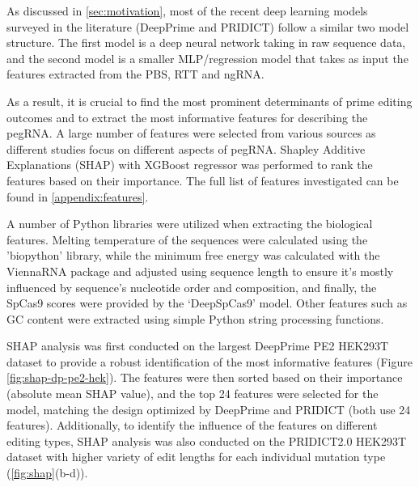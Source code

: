 As discussed in \autoref{sec:motivation}, most of the recent deep learning models surveyed in the literature (DeepPrime\cite{yuPredictionEfficienciesDiverse2023} and PRIDICT\cite{mathisPredictingPrimeEditing2023,mathisMachineLearningPrediction2024}) follow a similar two model structure. The first model is a deep neural network taking in raw sequence data, and the second model is a smaller MLP/regression model that takes as input the features extracted from the PBS, RTT and ngRNA. 

As a result, it is crucial to find the most prominent determinants of prime editing outcomes and to extract the most informative features for describing the pegRNA. A large number of features were selected from various sources as different studies focus on different aspects of pegRNA. Shapley Additive Explanations (SHAP) with XGBoost regressor was performed to rank the features based on their importance. The full list of features investigated can be found in \autoref{appendix:features}. 

A number of Python libraries were utilized when extracting the biological features. Melting temperature of the sequences were calculated using the 'biopython' library\cite{cockBiopythonFreelyAvailable2009}, while the minimum free energy was calculated with the ViennaRNA package and adjusted using sequence length to ensure it's mostly influenced by sequence's nucleotide order and composition\cite{lorenzViennaRNAPackage2011,trottaNormalizationMinimumFree2014}, and finally, the SpCas9 scores were provided by the `DeepSpCas9' model\cite{kimSpCas9ActivityPrediction2019}. Other features such as GC content were extracted using simple Python string processing functions.

SHAP analysis was first conducted on the largest DeepPrime PE2 HEK293T dataset to provide a robust identification of the most informative features (Figure \ref{fig:shap-dp-pe2-hek}). The features were then sorted based on their importance (absolute mean SHAP value), and the top 24 features were selected for the model, matching the design optimized by DeepPrime and PRIDICT (both use 24 features)\cite{yuPredictionEfficienciesDiverse2023,mathisMachineLearningPrediction2024}. Additionally, to identify the influence of the features on different editing types, SHAP analysis was also conducted on the PRIDICT2.0 HEK293T dataset with higher variety of edit lengths for each individual mutation type (\autoref{fig:shap}(b-d)).

